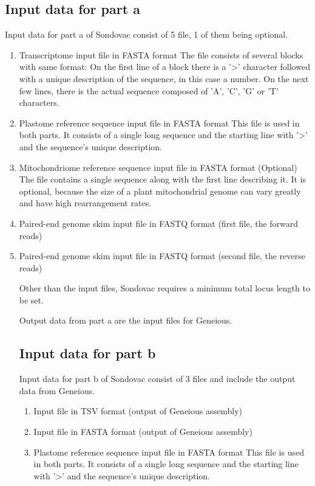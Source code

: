\subsection{Input data for part a}
Input data for part a of Sondovac consist of 5 file, 1 of them being optional. 
\begin{enumerate}
\item Transcriptome input file in FASTA format
The file consists of several blocks with same format: On the first line of a block there is a '>' character followed 
with a unique description of the sequence, in this case a number. On the next few lines, there is the actual sequence 
composed of 'A', 'C', 'G' or 'T' characters. 
\item Plastome reference sequence input file in FASTA format
This file is used in both parts. It consists of a single long sequence and the starting line with '>' and the sequence's 
unique description. 
\item Mitochondriome reference sequence input file in FASTA format (Optional)
The file contains a single sequence along with the first line describing it. It is optional, because the size of a plant
mitochondrial genome can vary greatly and have high rearrangement rates. 
\item Paired-end genome skim input file in FASTQ format (first file, the forward reads)
\item Paired-end genome skim input file in FASTQ format (second file, the reverse reads)

Other than the input files, Sondovac requires a minimum total locus length to be set. 

Output data from part a are the input files for Geneious. 

\subsection{Input data for part b}
Input data for part b of Sondovac consist of 3 files and include the output data from Geneious. 
\begin{enumerate}
\item Input file in TSV format (output of Geneious assembly)
\item Input file in FASTA format (output of Geneious assembly)
\item Plastome reference sequence input file in FASTA format
This file is used in both parts. It consists of a single long sequence and the starting line with '>' and the sequence's 
unique description. 
\end{enumerate}



\end{enumerate}

